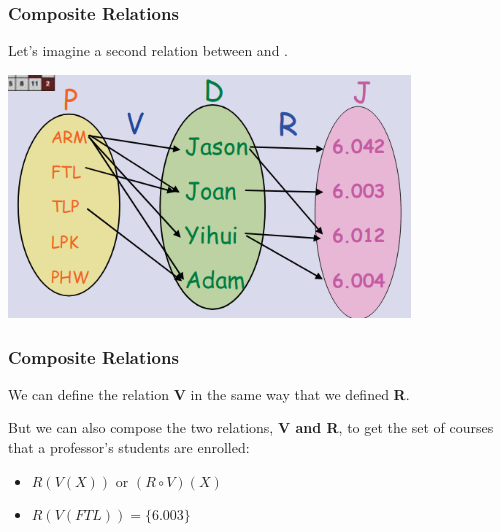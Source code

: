 \documentclass{beamer}
\begin{document}
\begin{frame}
  \frametitle{Composite Relations}

  {\larger Let's imagine a second relation between
     and .
  }
  \begin{center}
    \includegraphics[width=0.8\textwidth]{../img/composite_relation}
  \end{center}
\end{frame}

\begin{frame}
  \frametitle{Composite Relations}

  {\large
    We can define the relation {\bf V} in the same way that we defined {\bf R}.

    \bigskip

    But we can also compose the two relations, {\bf V and R}, to get
    the set of courses that a professor's students are enrolled:
    \begin{itemize}
    \item $R(V(X))$ or $(R\circ V)(X)$
    \item $R(V(FTL)) = \{6.003\}$ 
    \end{itemize}
  }
\end{frame}

\end{document}
